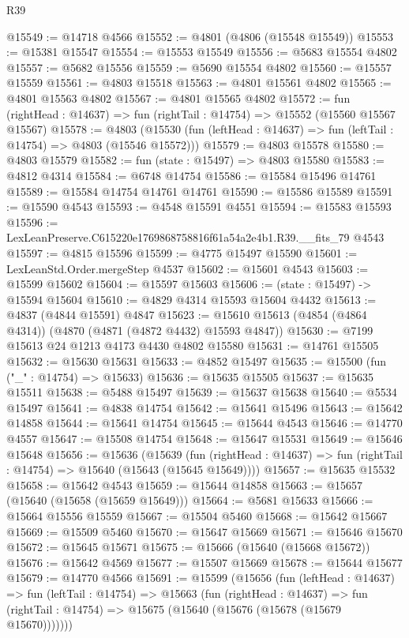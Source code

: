 \begin{lexlean}{R39}
\begin{coremodule}
@15549 := @14718 @4566
@15552 := @4801 (@4806 (@15548 @15549))
@15553 := @15381 @15547
@15554 := @15553 @15549
@15556 := @5683 @15554 @4802
@15557 := @5682 @15556
@15559 := @5690 @15554 @4802
@15560 := @15557 @15559
@15561 := @4803 @15518
@15563 := @4801 @15561 @4802
@15565 := @4801 @15563 @4802
@15567 := @4801 @15565 @4802
@15572 := fun (rightHead : @14637) => fun (rightTail : @14754) => @15552 (@15560 @15567 @15567)
@15578 := @4803
    (@15530 (fun (leftHead : @14637) => fun (leftTail : @14754) => @4803 (@15546 @15572)))
@15579 := @4803 @15578
@15580 := @4803 @15579
@15582 := fun (state : @15497) => @4803 @15580
@15583 := @4812 @4314
@15584 := @6748 @14754
@15586 := @15584 @15496 @14761
@15589 := @15584 @14754 @14761 @14761
@15590 := @15586 @15589
@15591 := @15590 @4543
@15593 := @4548 @15591 @4551
@15594 := @15583 @15593
@15596 := LexLeanPreserve.C615220e1769868758816f61a54a2e4b1.R39.__fits_79 @4543
@15597 := @4815 @15596
@15599 := @4775 @15497 @15590
@15601 := LexLeanStd.Order.mergeStep @4537
@15602 := @15601 @4543
@15603 := @15599 @15602
@15604 := @15597 @15603
@15606 := (state : @15497) -> @15594 @15604
@15610 := @4829 @4314 @15593 @15604 @4432
@15613 := @4837 (@4844 @15591) @4847
@15623 := @15610 @15613 (@4854 (@4864 @4314)) (@4870 (@4871 (@4872 @4432) @15593 @4847))
@15630 := @7199 @15613 @24 @1213 @4173 @4430 @4802 @15580
@15631 := @14761 @15505
@15632 := @15630 @15631
@15633 := @4852 @15497
@15635 := @15500 (fun ("_" : @14754) => @15633)
@15636 := @15635 @15505
@15637 := @15635 @15511
@15638 := @5488 @15497
@15639 := @15637 @15638
@15640 := @5534 @15497
@15641 := @4838 @14754
@15642 := @15641 @15496
@15643 := @15642 @14858
@15644 := @15641 @14754
@15645 := @15644 @4543
@15646 := @14770 @4557
@15647 := @15508 @14754
@15648 := @15647 @15531
@15649 := @15646 @15648
@15656 := @15636
    (@15639
      (fun (rightHead : @14637) => fun (rightTail : @14754) => @15640 (@15643 (@15645 @15649))))
@15657 := @15635 @15532
@15658 := @15642 @4543
@15659 := @15644 @14858
@15663 := @15657 (@15640 (@15658 (@15659 @15649)))
@15664 := @5681 @15633
@15666 := @15664 @15556 @15559
@15667 := @15504 @5460
@15668 := @15642 @15667
@15669 := @15509 @5460
@15670 := @15647 @15669
@15671 := @15646 @15670
@15672 := @15645 @15671
@15675 := @15666 (@15640 (@15668 @15672))
@15676 := @15642 @4569
@15677 := @15507 @15669
@15678 := @15644 @15677
@15679 := @14770 @4566
@15691 := @15599
    (@15656
      (fun (leftHead : @14637) =>
      fun (leftTail : @14754) =>
      @15663
        (fun (rightHead : @14637) =>
        fun (rightTail : @14754) => @15675 (@15640 (@15676 (@15678 (@15679 @15670)))))))

\end{coremodule}
\end{lexlean}
